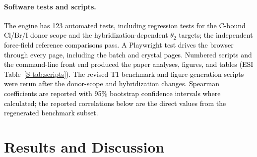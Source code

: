 \documentclass[journal=jcisd8,manuscript=article,layout=two-column]{achemso}
\newcommand{\tcb}[1]{{\textcolor{black}{#1}}}
\begin{document}
\paragraph{Software tests and scripts.}
\tcb{The engine has 123 automated tests, including regression tests for the C-bound Cl/Br/I donor scope and the hybridization-dependent $\theta_2$ targets; the independent force-field reference comparisons pass. A Playwright test drives the browser through every page, including the batch and crystal pages. Numbered scripts and the command-line front end produced the paper analyses, figures, and tables (ESI Table~\ref{S-tab:scripts}). The revised T1 benchmark and figure-generation scripts were rerun after the donor-scope and hybridization changes. Spearman coefficients are reported with 95\% bootstrap confidence intervals where calculated; the reported correlations below are the direct values from the regenerated benchmark subset.}

\section{Results and Discussion}
\end{document}

